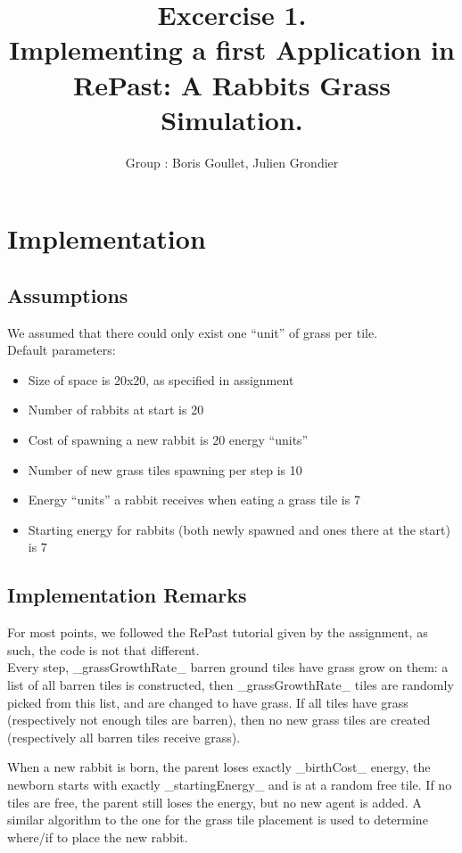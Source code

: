 \documentclass[11pt]{article}
\title{\bf Excercise 1.\\ Implementing a first Application in RePast: A Rabbits Grass Simulation.}
\author{Group \textnumero 25: Boris Goullet, Julien Grondier}
\begin{document}
\maketitle

\section{Implementation}

\subsection{Assumptions}

We assumed that there could only exist one ``unit'' of grass per tile.
\\Default parameters:
\begin{itemize}
\setlength\itemsep{0pt}
\item Size of space is 20x20, as specified in assignment
\item Number of rabbits at start is 20
\item Cost of spawning a new rabbit is 20 energy ``units''
\item Number of new grass tiles spawning per step is 10
\item Energy ``units'' a rabbit receives when eating a grass tile is 7
\item Starting energy for rabbits (both newly spawned and ones there at the start) is 7
\end{itemize}

\subsection{Implementation Remarks}
For most points, we followed the RePast tutorial given by the assignment, as such, the code is not that different.\\

Every step, _grassGrowthRate_ barren ground tiles have grass grow on them: a list of all barren tiles is constructed, then _grassGrowthRate_ tiles are randomly picked from this list, and are changed to have grass. If all tiles have grass (respectively not enough tiles are barren), then no new grass tiles are created (respectively all barren tiles receive grass).

When a new rabbit is born, the parent loses exactly _birthCost_ energy, the newborn starts with exactly _startingEnergy_ and is at a random free tile. If no tiles are free, the parent still loses the energy, but no new agent is added. A similar algorithm to the one for the grass tile placement is used to determine where/if to place the new rabbit.
\end{document}
